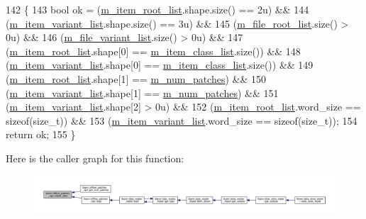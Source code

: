 \begin{DoxyCode}
142                                            \{
143   \textcolor{keywordtype}{bool} ok = (\hyperlink{classlbann_1_1offline__patches__npz_a5d61c89e80f8e67b4850fb72792ce862}{m\_item\_root\_list}.shape.size() == 2u) &&
144             (\hyperlink{classlbann_1_1offline__patches__npz_a5aec35e7b2f9956b8e7e8ce5cbb3ff22}{m\_item\_variant\_list}.shape.size() == 3u) &&
145             (\hyperlink{classlbann_1_1offline__patches__npz_a515ef05ef0679f3b6f1197d1ab47bfb3}{m\_file\_root\_list}.size() > 0u) &&
146             (\hyperlink{classlbann_1_1offline__patches__npz_a164d2bd134dc8c3946dc28d6ec5da0ec}{m\_file\_variant\_list}.size() > 0u) &&
147             (\hyperlink{classlbann_1_1offline__patches__npz_a5d61c89e80f8e67b4850fb72792ce862}{m\_item\_root\_list}.shape[0] == \hyperlink{classlbann_1_1offline__patches__npz_a5f90dc1b898f8ad9d7ea16c188738419}{m\_item\_class\_list}.size()) &&
148             (\hyperlink{classlbann_1_1offline__patches__npz_a5aec35e7b2f9956b8e7e8ce5cbb3ff22}{m\_item\_variant\_list}.shape[0] == 
      \hyperlink{classlbann_1_1offline__patches__npz_a5f90dc1b898f8ad9d7ea16c188738419}{m\_item\_class\_list}.size()) &&
149             (\hyperlink{classlbann_1_1offline__patches__npz_a5d61c89e80f8e67b4850fb72792ce862}{m\_item\_root\_list}.shape[1] == \hyperlink{classlbann_1_1offline__patches__npz_a5c13583d344641295301f82a32ebee41}{m\_num\_patches}) &&
150             (\hyperlink{classlbann_1_1offline__patches__npz_a5aec35e7b2f9956b8e7e8ce5cbb3ff22}{m\_item\_variant\_list}.shape[1] == \hyperlink{classlbann_1_1offline__patches__npz_a5c13583d344641295301f82a32ebee41}{m\_num\_patches}) &&
151             (\hyperlink{classlbann_1_1offline__patches__npz_a5aec35e7b2f9956b8e7e8ce5cbb3ff22}{m\_item\_variant\_list}.shape[2] > 0u) &&
152             (\hyperlink{classlbann_1_1offline__patches__npz_a5d61c89e80f8e67b4850fb72792ce862}{m\_item\_root\_list}.word\_size == \textcolor{keyword}{sizeof}(size\_t)) &&
153             (\hyperlink{classlbann_1_1offline__patches__npz_a5aec35e7b2f9956b8e7e8ce5cbb3ff22}{m\_item\_variant\_list}.word\_size == \textcolor{keyword}{sizeof}(size\_t));
154   \textcolor{keywordflow}{return} ok;
155 \}
\end{DoxyCode}
Here is the caller graph for this function\+:\nopagebreak
\begin{figure}[H]
\begin{center}
\leavevmode
\includegraphics[width=350pt]{classlbann_1_1offline__patches__npz_a44d8cad35ff9ad245856c5408965e53b_icgraph}
\end{center}
\end{figure}
\mbox{\label{classlbann_1_1offline__patches__npz_a9ffc5cc4b431a4ad18cd58651ca05ef8}} 

